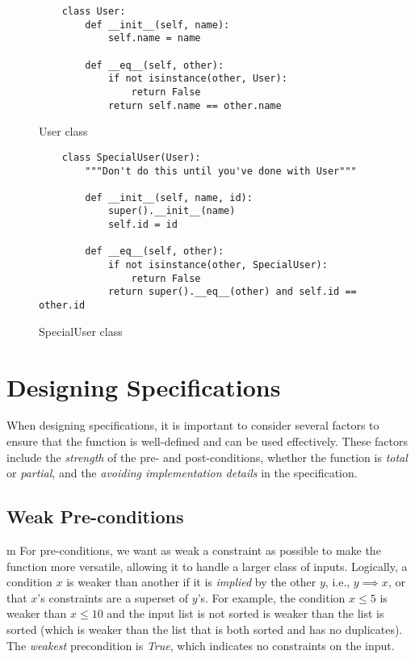 \documentclass[oneside,11pt,dvipsnames]{book}
\begin{document}
\begin{figure}
\begin{lstlisting}
    class User:
        def __init__(self, name):
            self.name = name

        def __eq__(self, other):
            if not isinstance(other, User):
                return False
            return self.name == other.name
\end{lstlisting}
\caption{User class}\label{ex:user}
\end{figure}


\begin{figure}
\begin{lstlisting}
    class SpecialUser(User):
        """Don't do this until you've done with User"""

        def __init__(self, name, id):
            super().__init__(name)
            self.id = id

        def __eq__(self, other):
            if not isinstance(other, SpecialUser):
                return False
            return super().__eq__(other) and self.id == other.id
\end{lstlisting}
\caption{SpecialUser class}\label{ex:specialuser}
\end{figure}



\section{Designing Specifications}\label{sec:design-specifications}

When designing specifications, it is important to consider several factors to ensure that the function is well-defined and can be used effectively. These factors include the \emph{strength} of the pre- and post-conditions, whether the function is \emph{total} or \emph{partial}, and the \emph{avoiding implementation details} in the specification.

\subsection{Weak Pre-conditions}m
For pre-conditions, we want as weak a constraint as possible to make the function more versatile, allowing it to handle a larger class of inputs.
Logically, a condition $x$ is weaker than another if it is \emph{implied} by the other $y$, i.e.,  $y \implies x$, or that $x$'s constraints are a superset of $y$'s. For example, the condition $x \le 5$ is weaker than $x \le 10$ and the input list is not sorted is weaker than the list is sorted (which is weaker than the list that is both sorted and has no duplicates).
The \emph{weakest} precondition is \emph{True}, which indicates no constraints on the input.
\end{document}
